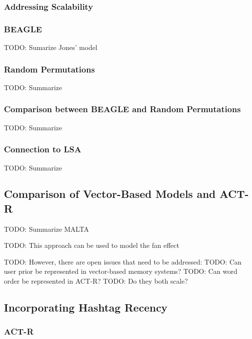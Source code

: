 \documentclass[man]{apa6}
\begin{document}
\subsubsection{Addressing Scalability}

\subsubsection{BEAGLE}

TODO: Sumarize Jones' model \cite{Jones2007}

\subsubsection{Random Permutations}

TODO: Summarize \cite{Sahlgren2008}

\subsubsection{Comparison between BEAGLE and Random Permutations}

TODO: Summarize \cite{Recchia2010}

\subsubsection{Connection to LSA}

TODO: Summarize \cite{Kanerva2000}

\subsection{Comparison of Vector-Based Models and ACT-R}

TODO: Summarize MALTA \cite{Rutledge2007}

TODO: This approach can be used to model the fan effect \cite{Rutledge2008} 

TODO: However, there are open issues that need to be addressed:
TODO: Can user prior be represented in vector-based memory systems?
TODO: Can word order be represented in ACT-R?
TODO: Do they both scale?

\subsection{Incorporating Hashtag Recency}

\subsubsection{ACT-R}
\end{document}
